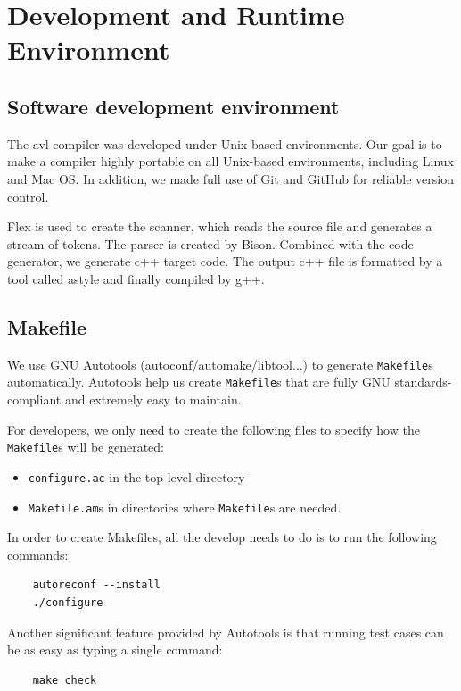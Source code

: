 \section{Development and Runtime Environment}

\subsection{Software development environment}

The avl compiler was developed under Unix-based environments. Our goal is to make a compiler highly
portable on all Unix-based environments, including Linux and Mac OS. In addition, we made full use
of Git and GitHub for reliable version control.

Flex is used to create the scanner, which reads the source file and generates a stream of tokens.
The parser is created by Bison. Combined with the code generator, we generate c++ target code. The
output c++ file is formatted by a tool called astyle and finally compiled by g++.

\subsection{Makefile}

We use GNU Autotools (autoconf/automake/libtool...) to generate \verb"Makefile"s automatically.
Autotools help us create \verb"Makefile"s that are fully GNU standards-compliant and extremely easy
to maintain.

For developers, we only need to create the following files to specify how the \verb"Makefile"s will
be generated:

\begin{itemize}
  \item \verb"configure.ac" in the top level directory
  \item \verb"Makefile.am"s in directories where \verb"Makefile"s are needed.
\end{itemize}

In order to create Makefiles, all the develop needs to do is to run the following commands:

\begin{verbatim}
    autoreconf --install
    ./configure
\end{verbatim}

Another significant feature provided by Autotools is that running test cases can be as easy as
typing a single command:

\begin{verbatim}
    make check
\end{verbatim}

